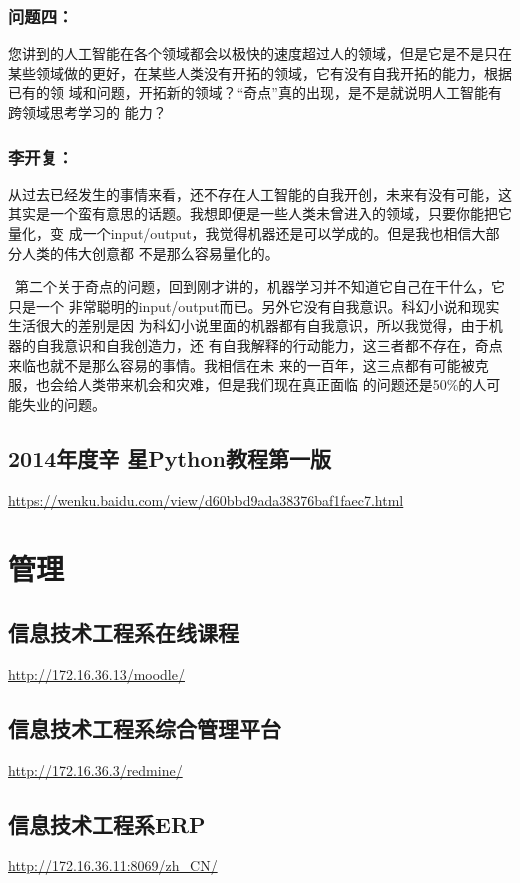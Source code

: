 \documentclass[11pt]{ctexart}
\begin{document}
{{{{\subsubsection{问题四：}
\label{sec:org684bcbf}
您讲到的人工智能在各个领域都会以极快的速度超过人的领域，但是它是不是只在
某些领域做的更好，在某些人类没有开拓的领域，它有没有自我开拓的能力，根据已有的领
域和问题，开拓新的领域？“奇点”真的出现，是不是就说明人工智能有跨领域思考学习的
能力？

\subsubsection{李开复：}
\label{sec:orgd31afc8}
从过去已经发生的事情来看，还不存在人工智能的自我开创，未来有没有可能，这
其实是一个蛮有意思的话题。我想即便是一些人类未曾进入的领域，只要你能把它量化，变
成一个input/output，我觉得机器还是可以学成的。但是我也相信大部分人类的伟大创意都
不是那么容易量化的。

 第二个关于奇点的问题，回到刚才讲的，机器学习并不知道它自己在干什么，它只是一个
非常聪明的input/output而已。另外它没有自我意识。科幻小说和现实生活很大的差别是因
为科幻小说里面的机器都有自我意识，所以我觉得，由于机器的自我意识和自我创造力，还
有自我解释的行动能力，这三者都不存在，奇点来临也就不是那么容易的事情。我相信在未
来的一百年，这三点都有可能被克服，也会给人类带来机会和灾难，但是我们现在真正面临
的问题还是50\%的人可能失业的问题。

\subsection{2014年度辛 星Python教程第一版}
\label{sec:org4a1e184}
\url{https://wenku.baidu.com/view/d60bbd9ada38376baf1faec7.html}
\section{管理}
\label{sec:orgd80a399}
\subsection{信息技术工程系在线课程}
\label{sec:orgc028081}
\url{http://172.16.36.13/moodle/}
\subsection{信息技术工程系综合管理平台}
\label{sec:org8f14eb9}
\url{http://172.16.36.3/redmine/}
\subsection{信息技术工程系ERP}
\label{sec:orgfa9f136}
\url{http://172.16.36.11:8069/zh\_CN/}
}}}}
\end{document}
